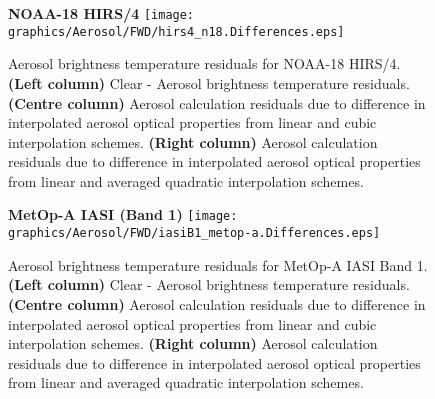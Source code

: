 \begin{figure}[htp]
  \centering
  \textsf{\textbf{NOAA-18 HIRS/4}}\vspace{1.5ex}
  \texttt{[image: graphics/Aerosol/FWD/hirs4\_n18.Differences.eps]}
  \caption{Aerosol brightness temperature residuals for NOAA-18 HIRS/4. \textbf{(Left column)} Clear - Aerosol brightness temperature residuals. \textbf{(Centre column)} Aerosol calculation residuals due to difference in interpolated aerosol optical properties from linear and cubic interpolation schemes. \textbf{(Right column)} Aerosol calculation residuals due to difference in interpolated aerosol optical properties from linear and averaged quadratic interpolation schemes.}
  \label{fig:hirs4_n18.Differences.FWD.Aerosol}
\end{figure}

\begin{figure}[htp]
  \centering
  \textsf{\textbf{MetOp-A IASI (Band 1)}}\vspace{1.5ex}
  \texttt{[image: graphics/Aerosol/FWD/iasiB1\_metop-a.Differences.eps]}
  \caption{Aerosol brightness temperature residuals for MetOp-A IASI Band 1. \textbf{(Left column)} Clear - Aerosol brightness temperature residuals. \textbf{(Centre column)} Aerosol calculation residuals due to difference in interpolated aerosol optical properties from linear and cubic  interpolation schemes. \textbf{(Right column)} Aerosol calculation residuals due to difference in interpolated aerosol optical properties from linear and averaged quadratic interpolation schemes.}
  \label{fig:iasiB1_metop-a.Differences.FWD.Aerosol}
\end{figure}

